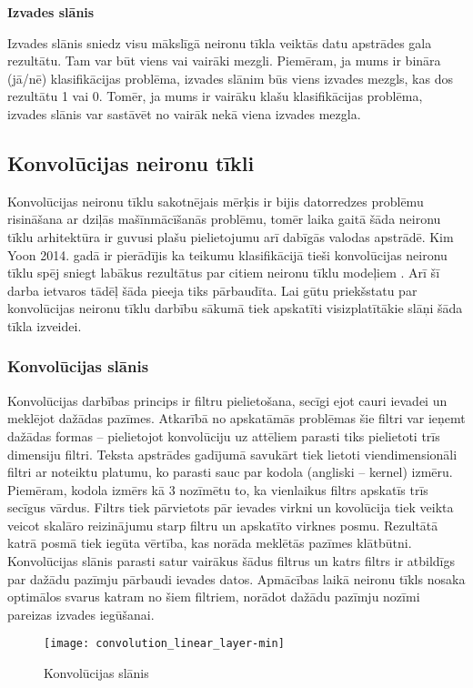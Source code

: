 \textbf{Izvades slānis}

Izvades slānis sniedz visu mākslīgā neironu tīkla veiktās datu apstrādes gala rezultātu. Tam var būt viens vai vairāki mezgli. Piemēram, ja mums ir bināra (jā/nē) klasifikācijas problēma, izvades slānim būs viens izvades mezgls, kas dos rezultātu 1 vai 0. Tomēr, ja mums ir vairāku klašu klasifikācijas problēma, izvades slānis var sastāvēt no vairāk nekā viena izvades mezgla.

\subsection{Konvolūcijas neironu tīkli}
Konvolūcijas neironu tīklu sakotnējais mērķis ir bijis datorredzes problēmu risināšana ar dziļās mašīnmācīšanās problēmu, tomēr laika gaitā šāda neironu tīklu arhitektūra ir guvusi plašu pielietojumu arī dabīgās valodas apstrādē. Kim Yoon 2014. gadā ir pierādījis ka teikumu klasifikācijā tieši konvolūcijas neironu tīklu spēj sniegt labākus rezultātus par citiem neironu tīklu modeļiem \cite{kimYoonCNN}. Arī šī darba ietvaros tādēļ šāda pieeja tiks pārbaudīta. Lai gūtu priekšstatu par konvolūcijas neironu tīklu darbību sākumā tiek apskatīti visizplatītākie slāņi šāda tīkla izveidei.

\subsubsection{Konvolūcijas slānis}
Konvolūcijas darbības princips ir filtru pielietošana, secīgi ejot cauri ievadei un meklējot dažādas pazīmes. Atkarībā no apskatāmās problēmas šie filtri var ieņemt dažādas  formas – pielietojot konvolūciju uz attēliem parasti tiks pielietoti trīs dimensiju filtri. Teksta apstrādes gadījumā savukārt tiek lietoti viendimensionāli filtri ar noteiktu platumu, ko parasti sauc par kodola (angliski – kernel) izmēru. Piemēram, kodola izmērs kā 3 nozīmētu to, ka vienlaikus filtrs apskatīs trīs secīgus vārdus. Filtrs tiek pārvietots pār ievades virkni un kovolūcija tiek veikta veicot skalāro reizinājumu starp filtru un apskatīto virknes posmu. Rezultātā katrā posmā tiek iegūta vērtība, kas norāda meklētās pazīmes klātbūtni. Konvolūcijas slānis parasti satur vairākus šādus filtrus un katrs filtrs ir atbildīgs par dažādu pazīmju pārbaudi ievades datos. Apmācības laikā neironu tīkls nosaka optimālos svarus katram no šiem filtriem, norādot dažādu pazīmju nozīmi pareizas izvades iegūšanai.

\begin{figure}[H]
	\texttt{[image: convolution\_linear\_layer-min]}
	\caption{Konvolūcijas slānis \cite{TextCNNLena}}
	\label{fig:convolution_linear_layer}
\end{figure}

